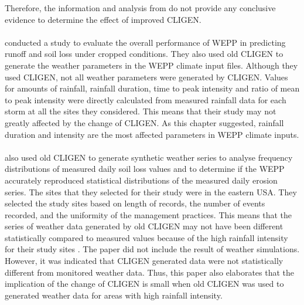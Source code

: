 Therefore, the information and analysis from \citet{baffaut1996-447} do not
provide any conclusive evidence to determine the effect of improved CLIGEN.

\paragraph{\citet{zhang1996-855}} conducted a study to evaluate the overall
performance of
WEPP in predicting runoff and soil loss under cropped conditions. They also used
old CLIGEN to generate the weather parameters in the WEPP climate input files.
Although they used CLIGEN, not all weather parameters were generated by CLIGEN.
Values for amounts of rainfall, rainfall duration, time to peak intensity and
ratio of mean to peak intensity were directly calculated from measured rainfall
data for each storm at all the sites they considered. This means that their
study may not greatly affected by the change of CLIGEN. As this chapter
suggested, rainfall duration and intensity are the most affected parameters in
WEPP climate inputs.

\paragraph{\citet{baffaut1998-756}} also used old CLIGEN to generate synthetic
weather
series to analyse frequency distributions of measured daily soil loss values and
to determine if the WEPP accurately reproduced statistical distributions of the
measured daily erosion series. The sites that they selected for their study
were in the eastern USA. They selected the study sites based on length of
records, the number of events recorded, and the uniformity of the management
practices. This means that the series of weather data generated by old CLIGEN
may not have been different statistically compared to measured values because
of the high rainfall intensity for their study sites \citep{ashley2003-3003}.
The paper did not include the result of weather simulations. However, it
was indicated that CLIGEN generated data were not statistically different from
monitored weather data. Thus, this paper also elaborates that the implication of
the change of CLIGEN is small when old CLIGEN was used to generated weather
data for areas with high rainfall intensity.

